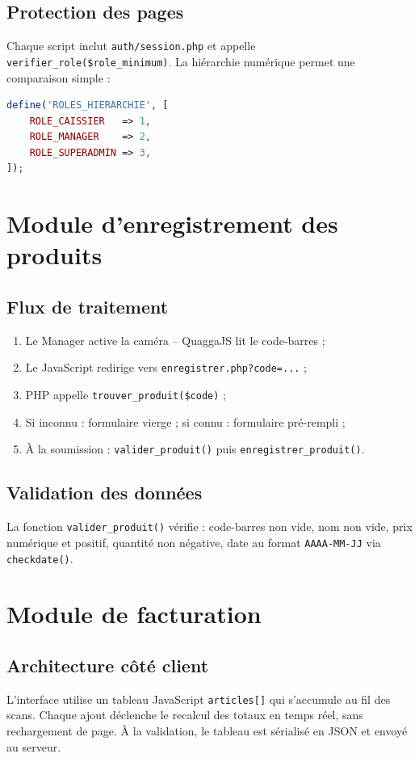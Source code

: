 \documentclass[12pt,a4paper]{report}
\begin{document}
\subsection{Protection des pages}
Chaque script inclut \texttt{auth/session.php} et appelle \texttt{verifier\_role(\$role\_minimum)}.
La hiérarchie numérique permet une comparaison simple :

\begin{lstlisting}[language=PHP,caption={Hiérarchie des rôles}]
define('ROLES_HIERARCHIE', [
    ROLE_CAISSIER   => 1,
    ROLE_MANAGER    => 2,
    ROLE_SUPERADMIN => 3,
]);
\end{lstlisting}

\section{Module d'enregistrement des produits}

\subsection{Flux de traitement}
\begin{enumerate}
  \item Le Manager active la caméra -- QuaggaJS lit le code-barres ;
  \item Le JavaScript redirige vers \texttt{enregistrer.php?code=...} ;
  \item PHP appelle \texttt{trouver\_produit(\$code)} ;
  \item Si inconnu : formulaire vierge ; si connu : formulaire pré-rempli ;
  \item À la soumission : \texttt{valider\_produit()} puis \texttt{enregistrer\_produit()}.
\end{enumerate}

\subsection{Validation des données}
La fonction \texttt{valider\_produit()} vérifie : code-barres non vide, nom non vide,
prix numérique et positif, quantité non négative, date au format \texttt{AAAA-MM-JJ}
via \texttt{checkdate()}.

\section{Module de facturation}

\subsection{Architecture côté client}
L'interface utilise un tableau JavaScript \texttt{articles[]} qui s'accumule au fil
des scans. Chaque ajout déclenche le recalcul des totaux en temps réel, sans rechargement
de page. À la validation, le tableau est sérialisé en JSON et envoyé au serveur.
\end{document}
